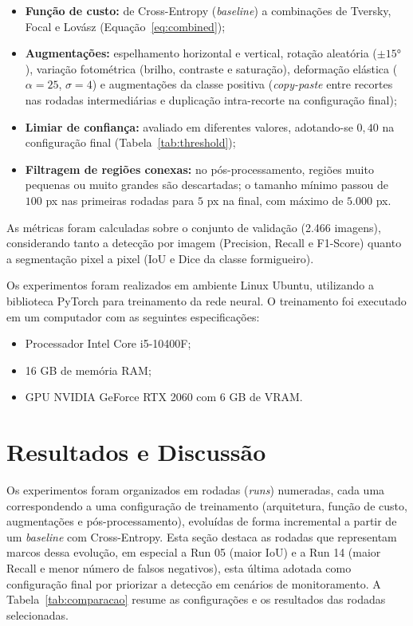 \documentclass[10pt,a4paper,twocolumn]{article}
\begin{document}
\begin{itemize}
    \item \textbf{Função de custo:} de Cross-Entropy (\textit{baseline}) a combinações de Tversky, Focal e Lovász (Equação~\ref{eq:combined});
    \item \textbf{Augmentações:} espelhamento horizontal e vertical, rotação aleatória ($\pm15°$), variação fotométrica (brilho, contraste e saturação), deformação elástica ($\alpha=25$, $\sigma=4$) e augmentações da classe positiva (\textit{copy-paste} entre recortes nas rodadas intermediárias e duplicação intra-recorte na configuração final);
    \item \textbf{Limiar de confiança:} avaliado em diferentes valores, adotando-se $0{,}40$ na configuração final (Tabela~\ref{tab:threshold});
    \item \textbf{Filtragem de regiões conexas:} no pós-processamento, regiões muito pequenas ou muito grandes são descartadas; o tamanho mínimo passou de $100$ px nas primeiras rodadas para $5$ px na final, com máximo de $5.000$ px.
\end{itemize}

As métricas foram calculadas sobre o conjunto de validação (2.466 imagens), considerando tanto a detecção por imagem (Precision, Recall e F1-Score) quanto a segmentação pixel a pixel (IoU e Dice da classe formigueiro).

Os experimentos foram realizados em ambiente Linux Ubuntu, utilizando a biblioteca PyTorch para treinamento da rede neural. O treinamento foi executado em um computador com as seguintes especificações:

\begin{itemize}
    \item Processador Intel Core i5-10400F;
    \item 16 GB de memória RAM;
    \item GPU NVIDIA GeForce RTX 2060 com 6 GB de VRAM.
\end{itemize}



\section{Resultados e Discussão}

Os experimentos foram organizados em rodadas (\textit{runs}) numeradas, cada uma correspondendo a uma configuração de treinamento (arquitetura, função de custo, augmentações e pós-processamento), evoluídas de forma incremental a partir de um \textit{baseline} com Cross-Entropy. Esta seção destaca as rodadas que representam marcos dessa evolução, em especial a Run 05 (maior IoU) e a Run 14 (maior Recall e menor número de falsos negativos), esta última adotada como configuração final por priorizar a detecção em cenários de monitoramento. A Tabela~\ref{tab:comparacao} resume as configurações e os resultados das rodadas selecionadas.
\end{document}
